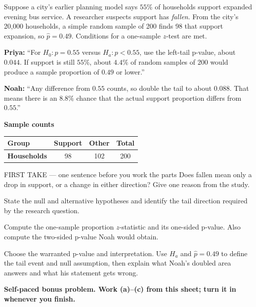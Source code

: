 \documentclass[14pt]{extarticle}
\begin{document}
\pagestyle{empty}


\noindent\begin{minipage}[t]{0.57\linewidth}
\vspace{0pt}
Suppose a city's earlier planning model says $55\%$ of households support expanded evening bus service. A researcher suspects support has \emph{fallen}. From the city's 20{,}000 households, a simple random sample of 200 finds 98 that support expansion, so $\hat p=0.49$. Conditions for a one-sample $z$-test are met.\par\smallskip \textbf{Priya:} ``For $H_0:p=0.55$ versus $H_a:p<0.55$, use the left-tail p-value, about $0.044$. If support is still $55\%$, about $4.4\%$ of random samples of 200 would produce a sample proportion of $0.49$ or lower.''\par \textbf{Noah:} ``Any difference from $0.55$ counts, so double the tail to about $0.088$. That means there is an $8.8\%$ chance that the actual support proportion differs from $0.55$.''\par
\end{minipage}\hfill
\begin{minipage}[t]{0.40\linewidth}
\vspace{0pt}
\begin{center}
\textbf{Sample counts}\par\smallskip
\begin{tabular}{|l|c|c|c|}
\hline
\textbf{Group} & \textbf{Support} & \textbf{Other} & \textbf{Total} \\ \hline
\textbf{Households} & 98 & 102 & 200 \\ \hline
\end{tabular}
\end{center}
\end{minipage}

\begin{firsttakebox}{FIRST TAKE --- one sentence before you work the parts}
Does fallen mean only a drop in support, or a change in either direction? Give one reason from the study.
\end{firsttakebox}

\begin{description}[leftmargin=1.15in, labelwidth=1in, itemsep=2pt, topsep=2pt]
  \item[\dokbadge{1}~(a)] State the null and alternative hypotheses and identify the tail direction required by the research question.
  \item[\dokbadge{2}~(b)] Compute the one-sample proportion $z$-statistic and its one-sided p-value. Also compute the two-sided p-value Noah would obtain.
  \item[\dokbadge{3}~(c)] Choose the warranted p-value and interpretation. Use $H_a$ and $\hat p=0.49$ to define the tail event and null assumption, then explain what Noah's doubled area answers and what his statement gets wrong.
\end{description}

\vfill
\textbf{Self-paced bonus problem. Work (a)--(c) from this sheet; turn it in whenever you finish.}
\end{document}
